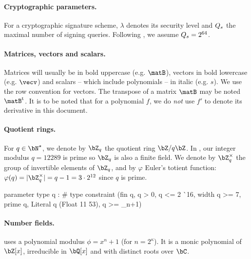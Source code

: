 \paragraph{Cryptographic parameters.} For a cryptographic signature scheme, $\lambda$ denotes its security level and $Q_s$ the maximal number of signing queries. Following \cite{NIST}, we assume $Q_s = 2^{64}$.

\paragraph{Matrices, vectors and scalars.} Matrices will usually be in bold uppercase (e.g. $\matB$), vectors in bold lowercase (e.g. $\vecv$) and scalars -- which include polynomials -- in italic (e.g. $s$). We use the row convention for vectors. The transpose of a matrix $\matB$ may be noted $\matB^\t$. It is to be noted that for a polynomial $f$, we do \emph{not} use $f'$ to denote its derivative in this document.

\paragraph{Quotient rings.} For $q \in \bN^\star$, we denote by $\bZ_q$ the quotient ring $\bZ/q\bZ$. In \falcon, our integer modulus $q = 12289$ is prime so $\bZ_q$ is also a finite field. We denote by $\bZ_q^\times$ the group of invertible elements of $\bZ_q$, and by $\varphi$ Euler's totient function: $\varphi(q) = |\bZ_q^\times| = q - 1 = 3 \cdot 2^{12}$ since $q$ is prime.
\begin{code}
  parameter
    type q : #
    type constraint (fin q, q > 0, q <= 2 ^^ 16, width q >= 7,
                     prime q, Literal q (Float 11 53), q >= _n+1)
\end{code}


\paragraph{Number fields.} \falcon uses a polynomial modulus $\phi = x^n+1$ (for $n = 2^\kappa$). It is a monic polynomial of $\bZ[x]$, irreducible in $\bQ[x]$ and with distinct roots over $\bC$.

